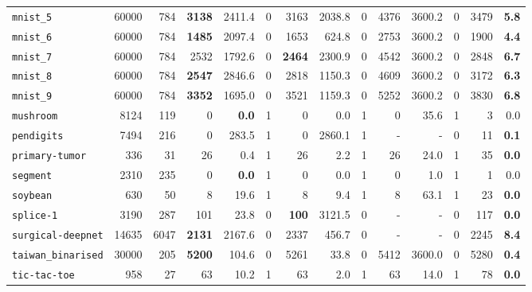 \begin{tabular}{lccrrrrrrrrrrr}
\texttt{mnist\_5} & \multicolumn{1}{r}{60000} & \multicolumn{1}{r}{784}  & \textbf{3138} & 2411.4 & 0 & 3163 & 2038.8 & 0 & 4376 & 3600.2 & 0 & 3479 & \textbf{5.8}\\
\texttt{mnist\_6} & \multicolumn{1}{r}{60000} & \multicolumn{1}{r}{784}  & \textbf{1485} & 2097.4 & 0 & 1653 & 624.8 & 0 & 2753 & 3600.2 & 0 & 1900 & \textbf{4.4}\\
\texttt{mnist\_7} & \multicolumn{1}{r}{60000} & \multicolumn{1}{r}{784}  & 2532 & 1792.6 & 0 & \textbf{2464} & 2300.9 & 0 & 4542 & 3600.2 & 0 & 2848 & \textbf{6.7}\\
\texttt{mnist\_8} & \multicolumn{1}{r}{60000} & \multicolumn{1}{r}{784}  & \textbf{2547} & 2846.6 & 0 & 2818 & 1150.3 & 0 & 4609 & 3600.2 & 0 & 3172 & \textbf{6.3}\\
\texttt{mnist\_9} & \multicolumn{1}{r}{60000} & \multicolumn{1}{r}{784}  & \textbf{3352} & 1695.0 & 0 & 3521 & 1159.3 & 0 & 5252 & 3600.2 & 0 & 3830 & \textbf{6.8}\\
\texttt{mushroom} & \multicolumn{1}{r}{8124} & \multicolumn{1}{r}{119}  & 0 & \textbf{0.0} & 1 & 0 & 0.0 & 1 & 0 & 35.6 & 1 & 3 & 0.0\\
\texttt{pendigits} & \multicolumn{1}{r}{7494} & \multicolumn{1}{r}{216}  & 0 & 283.5 & 1 & 0 & 2860.1 & 1 & - & - & 0 & 11 & \textbf{0.1}\\
\texttt{primary-tumor} & \multicolumn{1}{r}{336} & \multicolumn{1}{r}{31}  & 26 & 0.4 & 1 & 26 & 2.2 & 1 & 26 & 24.0 & 1 & 35 & \textbf{0.0}\\
\texttt{segment} & \multicolumn{1}{r}{2310} & \multicolumn{1}{r}{235}  & 0 & \textbf{0.0} & 1 & 0 & 0.0 & 1 & 0 & 1.0 & 1 & 1 & 0.0\\
\texttt{soybean} & \multicolumn{1}{r}{630} & \multicolumn{1}{r}{50}  & 8 & 19.6 & 1 & 8 & 9.4 & 1 & 8 & 63.1 & 1 & 23 & \textbf{0.0}\\
\texttt{splice-1} & \multicolumn{1}{r}{3190} & \multicolumn{1}{r}{287}  & 101 & 23.8 & 0 & \textbf{100} & 3121.5 & 0 & - & - & 0 & 117 & \textbf{0.0}\\
\texttt{surgical-deepnet} & \multicolumn{1}{r}{14635} & \multicolumn{1}{r}{6047}  & \textbf{2131} & 2167.6 & 0 & 2337 & 456.7 & 0 & - & - & 0 & 2245 & \textbf{8.4}\\
\texttt{taiwan\_binarised} & \multicolumn{1}{r}{30000} & \multicolumn{1}{r}{205}  & \textbf{5200} & 104.6 & 0 & 5261 & 33.8 & 0 & 5412 & 3600.0 & 0 & 5280 & \textbf{0.4}\\
\texttt{tic-tac-toe} & \multicolumn{1}{r}{958} & \multicolumn{1}{r}{27}  & 63 & 10.2 & 1 & 63 & 2.0 & 1 & 63 & 14.0 & 1 & 78 & \textbf{0.0}\\

\end{tabular}
